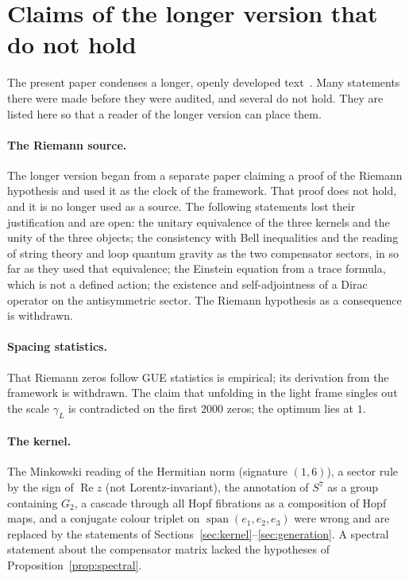 \section{Claims of the longer version that do not hold}\label{app:earlier}

The present paper condenses a longer, openly developed text~\cite{companion}.  Many statements there were made before they were audited,
and several do not hold.  They are listed here so that a reader of the longer version can place them.

\paragraph{The Riemann source.}  The longer version began from a separate paper claiming a proof of the Riemann hypothesis and used it as
the clock of the framework.  That proof does not hold, and it is no longer used as a source.  The following statements lost their
justification and are open: the unitary equivalence of the three kernels and the unity of the three objects; the consistency with Bell
inequalities and the reading of string theory and loop quantum gravity as the two compensator sectors, in so far as they used that
equivalence; the Einstein equation from a trace formula, which is not a defined action; the existence and self-adjointness of a Dirac
operator on the antisymmetric sector.  The Riemann hypothesis as a consequence is withdrawn.

\paragraph{Spacing statistics.}  That Riemann zeros follow GUE statistics is empirical; its derivation from the framework is withdrawn.  The
claim that unfolding in the light frame singles out the scale \(\gamma_L\) is contradicted on the first \(2000\) zeros; the optimum lies at \(1\).

\paragraph{The kernel.}  The Minkowski reading of the Hermitian norm (signature \((1,6)\)), a sector rule by the sign of \(\operatorname{Re}z\)
(not Lorentz-invariant), the annotation of \(S^7\) as a group containing \(G_2\), a cascade through all Hopf fibrations as a composition of
Hopf maps, and a conjugate colour triplet on \(\operatorname{span}(e_1,e_2,e_3)\) were wrong and are replaced by the statements of
Sections~\ref{sec:kernel}--\ref{sec:generation}.  A spectral statement about the compensator matrix lacked the hypotheses of
Proposition~\ref{prop:spectral}.


